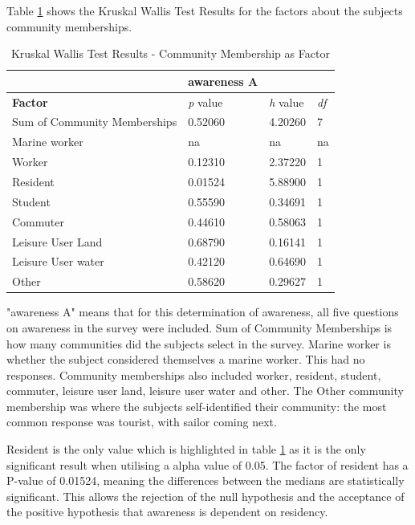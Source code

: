 Table \ref{kw_test_com_membership} shows the Kruskal Wallis Test Results for the factors about the subjects community memberships. 


\begin{table}[H]
    \centering
    \begin{tabular}{|l|l|l|l|}
    \hline
         ~ & \textbf{awareness A} & ~ & ~ \\ \hline
        \textbf{Factor} &\textit{p} value &\textit{h} value & \textit{df} \\ \hline
        Sum of Community Memberships & 0.52060 & 4.20260 & 7 \\ \hline
        Marine worker & na & na & na \\ \hline
        Worker & 0.12310 & 2.37220 & 1 \\ \hline
        Resident & \cellcolor[HTML]{7df9ff} 0.01524 & 5.88900 & 1 \\ \hline
        Student & 0.55590 & 0.34691 & 1 \\ \hline
        Commuter & 0.44610 & 0.58063 & 1 \\ \hline
        Leisure User Land & 0.68790 & 0.16141 & 1 \\ \hline
        Leisure User water & 0.42120 & 0.64690 & 1 \\ \hline
        Other & 0.58620 & 0.29627 & 1 \\ \hline
    \end{tabular}
    \caption{Kruskal Wallis Test Results - Community Membership as Factor}{ "awareness A" means that for this determination of awareness, all five questions on awareness in the survey were included. Sum of Community Memberships is how many communities did the subjects select in the survey. Marine worker is whether the subject considered themselves a marine worker. This had no responses. Community memberships also included worker, resident, student, commuter, leisure user land, leisure user water and other. The Other community membership was where the subjects self-identified their community: the most common response was tourist, with sailor coming next. }
    \label{kw_test_com_membership}
\end{table}
Resident is the only value which is highlighted in table \ref{kw_test_com_membership} as it is the only significant result when utilising a alpha value of 0.05. The factor of resident has a P-value of 0.01524, meaning the differences between the medians are statistically significant. This allows the rejection of the null hypothesis and the acceptance of the positive hypothesis that awareness is dependent on residency. 
